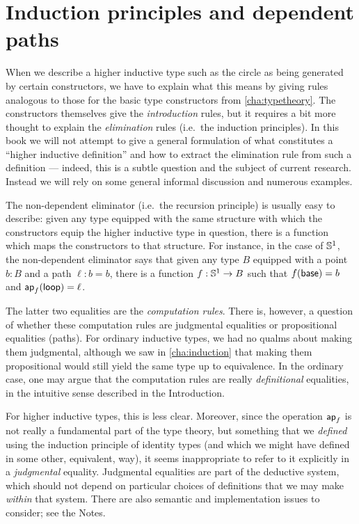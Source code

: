 \section{Induction principles and dependent paths}
\label{sec:dependent-paths}

When we describe a higher inductive type such as the circle as being generated by certain constructors, we have to explain what this means by giving rules analogous to those for the basic type constructors from \autoref{cha:typetheory}.
The constructors themselves give the \emph{introduction} rules, but it requires a bit more thought to explain the \emph{elimination} rules (i.e.\ the induction principles).
In this book we will not attempt to give a general formulation of what constitutes a ``higher inductive definition'' and how to extract the elimination rule from such a definition --- indeed, this is a subtle question and the subject of current research.
Instead we will rely on some general informal discussion and numerous examples.

The non-dependent eliminator (i.e.\ the recursion principle) is usually easy to describe: given any type equipped with the same structure with which the constructors equip the higher inductive type in question, there is a function which maps the constructors to that structure.
For instance, in the case of $\mathbb{S}^1$, the non-dependent eliminator says that given any type $B$ equipped with a point $b:B$ and a path $\ell:b=b$, there is a function $f:\mathbb{S}^1\to B$ such that $f(\mathsf{base})=b$ and $\mathsf{ap}_{f} (\mathsf{loop}) = \ell$.

The latter two equalities are the \emph{computation rules}.
There is, however, a question of whether these computation rules are judgmental equalities or propositional equalities (paths).
For ordinary inductive types, we had no qualms about making them judgmental, although we saw in \autoref{cha:induction} that making them propositional would still yield the same type up to equivalence.
In the ordinary case, one may argue that the computation rules are really \emph{definitional} equalities, in the intuitive sense described in the Introduction.

For higher inductive types, this is less clear. %
Moreover, since the operation $\mathsf{ap}_{f}$ is not really a fundamental part of the type theory, but something that we \emph{defined} using the induction principle of identity types (and which we might have defined in some other, equivalent, way), it seems inappropriate to refer to it explicitly in a \emph{judgmental} equality.
Judgmental equalities are part of the deductive system, which should not depend on particular choices of definitions that we may make \emph{within} that system.
There are also semantic and implementation issues to consider; see the Notes.

